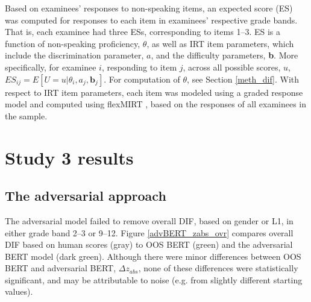 \documentclass [PhD] {uclathes}
\begin{document}
Based on examinees’ responses to non-speaking items, an expected score (ES) was computed for responses to each item in examinees’ respective grade bands. That is, each examinee had three ESs, corresponding to items 1–3. ES is a function of non-speaking proficiency, $\theta$, as well as IRT item parameters, which include the discrimination parameter, $a$, and the difficulty parameters, \textbf{b}. More specifically, for examinee $i$, responding to item $j$, across all possible scores, $u$, $ES_{ij} = E[U=u|\theta_i, a_j, \textbf{b}_j]$. For computation of $\theta$, see Section \ref{meth_dif}. With respect to IRT item parameters, each item was modeled using a graded response model \citep{samejima1997graded} and computed using flexMIRT \citep{cai2012flexmirt}, based on the responses of all examinees in the sample. 

\section{Study 3 results}

\subsection{The adversarial approach}

The adversarial model failed to remove overall DIF, based on gender or L1, in either grade band 2–3 or 9–12. Figure \ref{advBERT_zabs_ovr} compares overall DIF based on human scores (gray) to OOS BERT (green) and the adversarial BERT model (dark green). Although there were minor differences between OOS BERT and adversarial BERT, $\Delta z_{abs}$, none of these differences were statistically significant, and may be attributable to noise (e.g. from slightly different starting values). 
\end{document}
